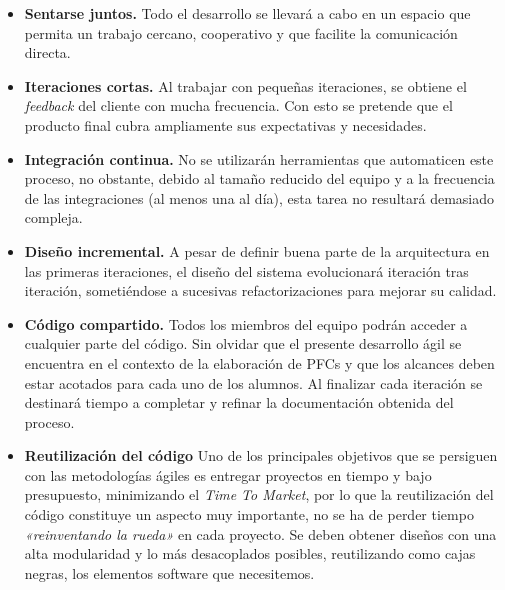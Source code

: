 \begin{itemize}
\item \textbf{Sentarse juntos.} Todo el desarrollo se llevará a cabo en un espacio que permita un trabajo cercano, cooperativo y que facilite la comunicación directa. %

\item \textbf{Iteraciones cortas.}  Al trabajar con pequeñas iteraciones, se obtiene el \textit{feedback} del cliente con mucha frecuencia. Con esto se pretende que el producto final cubra ampliamente sus expectativas y necesidades. 

\item \textbf{Integración continua.} No se utilizarán herramientas que automaticen este proceso, no obstante, debido al tamaño reducido del equipo y a la frecuencia de las integraciones (al menos una al día), esta tarea no resultará demasiado compleja. 

\item \textbf{Diseño incremental.} A pesar de definir buena parte de la arquitectura en las primeras iteraciones, el diseño del sistema evolucionará iteración tras iteración, sometiéndose a sucesivas refactorizaciones para mejorar su calidad.  

\item \textbf{Código compartido.} Todos los miembros del equipo podrán acceder a cualquier parte del código. Sin olvidar que el presente desarrollo ágil se encuentra en el contexto de la elaboración de PFCs y que los alcances deben estar acotados para cada uno de los alumnos. Al finalizar cada  iteración se destinará tiempo a completar y refinar la documentación obtenida del proceso.

\item \textbf{Reutilización del código} Uno de los principales objetivos que se persiguen con las metodologías ágiles es entregar proyectos en tiempo y bajo presupuesto, minimizando el \textit{Time To Market}, por lo que la reutilización del código constituye un aspecto muy importante, no se ha de perder tiempo \textit{«reinventando la rueda»} en cada proyecto. Se deben obtener diseños con una alta modularidad y lo más desacoplados posibles, reutilizando como cajas negras, los elementos software que necesitemos. 

\end{itemize}

